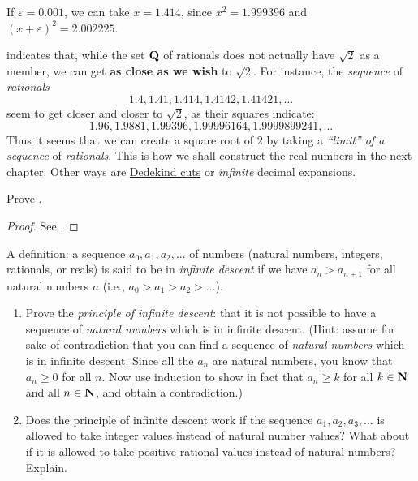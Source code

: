 \begin{example} \label{example 4.4.6}
If \(\varepsilon = 0.001\), we can take \(x = 1.414\), since \(x^2 = 1.999396\) and \((x + \varepsilon)^2 = 2.002225\).
\end{example}

 indicates that, while the set \(\mathbf{Q}\) of rationals does not actually have \(\sqrt{2}\) as a member, we can get \textbf{as close as we wish} to \(\sqrt{2}\).
For instance, the \emph{sequence} of \emph{rationals}
\[
    1.4, 1.41, 1.414, 1.4142, 1.41421,...
\]
seem to get closer and closer to \(\sqrt{2}\), as their squares indicate:
\[
    1.96, 1.9881, 1.99396, 1.99996164, 1.9999899241,...
\]
Thus it seems that we can create a square root of \(2\) by taking a \emph{``limit'' of a sequence} of \emph{rationals}.
This is how we shall construct the real numbers in the next chapter.
Other ways are \href{https://www.wikiwand.com/en/Dedekind_cut}{Dedekind cuts} or \emph{infinite} decimal expansions.

\exercisesection

\begin{exercise} \label{exercise 4.4.1}
Prove .
\end{exercise}

\begin{proof}
See .
\end{proof}

\begin{exercise}\label{exercise 4.4.2}
A definition: a sequence \(a_0, a_1, a_2, ...\) of numbers (natural numbers, integers, rationals, or reals) is said to be in \emph{infinite descent} if we have \(a_n > a_{n + 1}\) for all natural numbers \(n\)
(i.e., \(a_0 > a_1 > a_2 > \dots\)).
\begin{enumerate}
    \item
        Prove the \emph{principle of infinite descent}:
        that it is not possible to have a sequence of \emph{natural numbers} which is in infinite descent.
        (Hint: assume for sake of contradiction that you can find a sequence of \emph{natural numbers} which is in infinite descent.
        Since all the \(a_n\) are natural numbers, you know that \(a_n \ge 0\) for all \(n\).
        Now use induction to show in fact that \(a_n \ge k\) for all \(k \in \mathbf{N}\) and all \(n \in \mathbf{N}\), and obtain a contradiction.)
    \item
        Does the principle of infinite descent work if the sequence \(a_1, a_2, a_3, \dots\) is allowed to take integer values instead of natural number values?
        What about if it is allowed to take positive rational values instead of natural numbers? Explain.
\end{enumerate}
\end{exercise}

